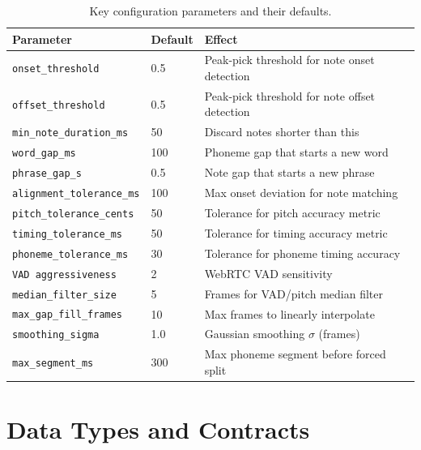 \documentclass[11pt,letterpaper]{article}
\begin{document}
\begin{table}[h]
  \centering
  \caption{Key configuration parameters and their defaults.}
  \label{tab:config}
  \renewcommand{\arraystretch}{1.2}
  \begin{tabular}{@{}lll@{}}
    \toprule
    Parameter & Default & Effect \\
    \midrule
    \texttt{onset\_threshold}   & 0.5     & Peak-pick threshold for note onset detection \\
    \texttt{offset\_threshold}  & 0.5     & Peak-pick threshold for note offset detection \\
    \texttt{min\_note\_duration\_ms} & 50 & Discard notes shorter than this \\
    \texttt{word\_gap\_ms}      & 100     & Phoneme gap that starts a new word \\
    \texttt{phrase\_gap\_s}     & 0.5     & Note gap that starts a new phrase \\
    \texttt{alignment\_tolerance\_ms} & 100 & Max onset deviation for note matching \\
    \texttt{pitch\_tolerance\_cents}  & 50  & Tolerance for pitch accuracy metric \\
    \texttt{timing\_tolerance\_ms}    & 50  & Tolerance for timing accuracy metric \\
    \texttt{phoneme\_tolerance\_ms}   & 30  & Tolerance for phoneme timing accuracy \\
    \texttt{VAD aggressiveness}       & 2   & WebRTC VAD sensitivity \\
    \texttt{median\_filter\_size}     & 5   & Frames for VAD/pitch median filter \\
    \texttt{max\_gap\_fill\_frames}   & 10  & Max frames to linearly interpolate \\
    \texttt{smoothing\_sigma}         & 1.0 & Gaussian smoothing $\sigma$ (frames) \\
    \texttt{max\_segment\_ms}         & 300 & Max phoneme segment before forced split \\
    \bottomrule
  \end{tabular}
\end{table}

\section{Data Types and Contracts}
\end{document}
